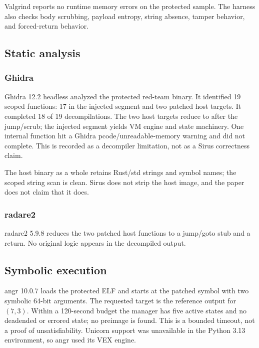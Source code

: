 Valgrind reports no runtime memory errors on the protected sample. The
 harness also checks body scrubbing, payload entropy,
string absence, tamper behavior, and forced-return behavior.

\subsection{Static analysis}

\subsubsection{Ghidra}

Ghidra 12.2 headless analyzed the protected red-team binary. It identified 19
scoped functions: 17 in the injected  segment and two patched host
targets. It completed 18 of 19 decompilations. The two host targets reduce to
 after the jump/scrub; the injected segment yields VM
engine and state machinery. One internal  function hit a Ghidra
pcode/unreadable-memory warning and did not complete. This is recorded as a
decompiler limitation, not as a Sirus correctness claim.

The host binary as a whole retains Rust/std strings and symbol names; the scoped
 string scan is clean. Sirus does not strip the host image, and the
paper does not claim that it does.

\subsubsection{radare2}

radare2 5.9.8  reduces the two patched host functions to a jump/goto
stub and a return. No original logic appears in the decompiled output.

\subsection{Symbolic execution}

angr 10.0.7 loads the protected ELF and starts at the patched
 symbol with two symbolic 64-bit arguments. The requested
target is the reference output for $(7,3)$. Within a 120-second budget the
manager has five active states and no deadended or errored state; no preimage is
found. This is a bounded timeout, not a proof of unsatisfiability. Unicorn
support was unavailable in the Python 3.13 environment, so angr used its VEX
engine.

